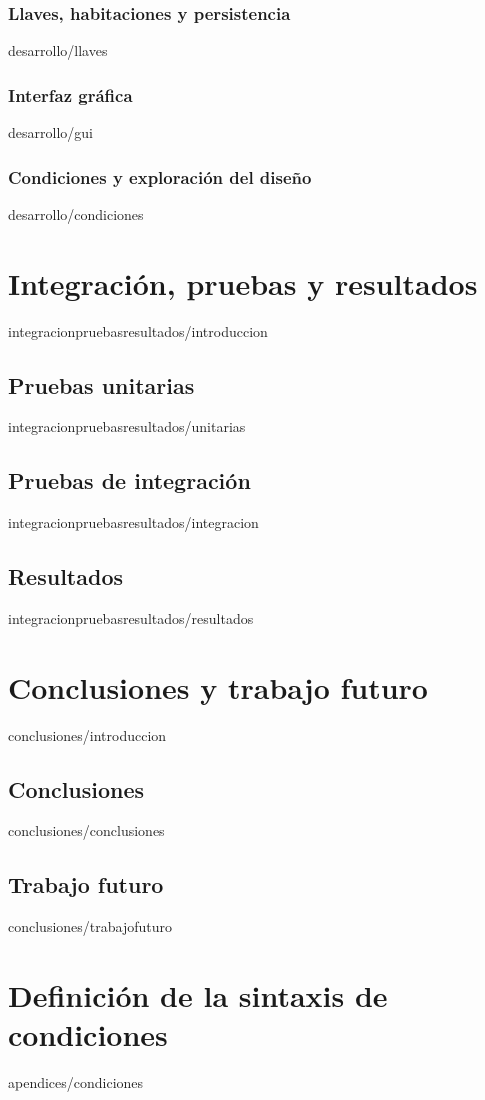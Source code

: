 \documentclass[epsbased,copyright,final,printable,covers,extendedindex,firstnumbered,tfg,gnuplot]{tfgtfmthesisuam}
\begin{document}
		\subsection{Llaves, habitaciones y persistencia\label{SUBSEC:DEVLLAVES}}{desarrollo/llaves}%
		\subsection{Interfaz gráfica\label{SUBSEC:DEVGUI}}{desarrollo/gui} %
		\subsection{Condiciones y exploración del diseño\label{SUBSEC:CONDICIONES}}{desarrollo/condiciones} %

\chapter{Integración, pruebas y resultados\label{CAP:INTEGRACIONPRUEBASYRESULTADOS}}{integracionpruebasresultados/introduccion}
	\section{Pruebas unitarias\label{SEC:PRUEBASUNITARIAS}}{integracionpruebasresultados/unitarias}
	\section{Pruebas de integración\label{SEC:PRUEBASINTEGRACION}}{integracionpruebasresultados/integracion}
	\section{Resultados\label{SEC:RESULTADOS}}{integracionpruebasresultados/resultados}

\chapter{Conclusiones y trabajo futuro\label{CAP:CONCLUSIONES}}{conclusiones/introduccion}
	\section{Conclusiones\label{SEC:CONCLUSIONES}}{conclusiones/conclusiones}
	\section{Trabajo futuro\label{SEC:TRABAJOFUTURO}}{conclusiones/trabajofuturo}

\appendix

\chapter{Definición de la sintaxis de condiciones\label{CAP:APCONDICIONES}}{apendices/condiciones}
\end{document}
